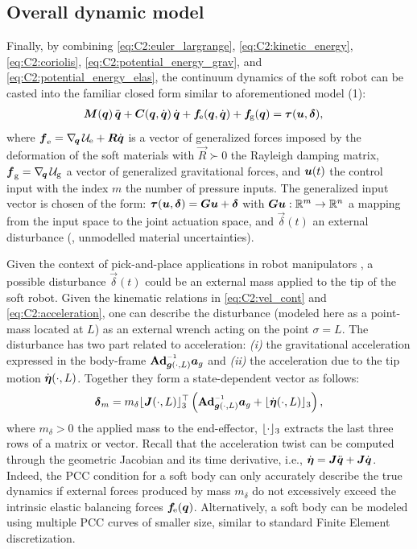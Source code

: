 \subsection{Overall dynamic model}
\noindent Finally, by combining \eqref{eq:C2:euler_largrange}, \eqref{eq:C2:kinetic_energy}, \eqref{eq:C2:coriolis}, \eqref{eq:C2:potential_energy_grav}, and \eqref{eq:C2:potential_energy_elas}, the continuum dynamics of the soft robot can be casted into the familiar closed form
\cite{DellaSantina2020,Boyer2021,Renda2018} similar to aforementioned model (1):
%
\begin{align}
\boldsymbol{M}({\boldsymbol{q}})\,{\ddot{\boldsymbol{q}}} + \boldsymbol{C}({\boldsymbol{q}},{\dot{\boldsymbol{q}}})\,{\dot{\boldsymbol{q}}} + {\boldsymbol{f}}\!_{\scriptstyle\textrm{e}}({\boldsymbol{q}},{\dot{\boldsymbol{q}}}) + {\boldsymbol{f}}\!_{\scriptstyle\textrm{g}}({\boldsymbol{q}}) & = \boldsymbol{\tau}({\boldsymbol{u}},\boldsymbol{\delta}),
\label{eq:C2:dynamic_model}
\end{align}
%
where ${\boldsymbol{f}}_{\scriptstyle\textrm{e}} = \nabla_{\!{\boldsymbol{q}}}\,\mathcal{U}_{\textrm{e}} + \boldsymbol{R}{\dot{\boldsymbol{q}}}$ is a vector of generalized forces imposed by the deformation of the soft materials with $\vec{R} \succ 0$ the Rayleigh damping matrix,
$\boldsymbol{f}_{\scriptstyle\textrm{g}} = \nabla_{\!{\boldsymbol{q}}}\, \mathcal{U}_{\scriptstyle\textrm{g}}$ a vector of generalized gravitational forces, and
${\boldsymbol{u}}(t)$ the control input with the index
$m$ the number of pressure inputs. The generalized input vector is chosen of the form:
$\boldsymbol{\tau}({\boldsymbol{u}},\boldsymbol{\delta}) = \boldsymbol{G}{\boldsymbol{u}} + \boldsymbol{\delta}$ with $\boldsymbol{G} {\boldsymbol{u}}: \mathbb{R}^m \to \mathbb{R}^n$ a mapping from the input space to the joint actuation space, and $\vec{\delta}(t)$ an external disturbance (\eg, unmodelled material uncertainties).
%
\begin{rmk}
Given the context of  pick-and-place applications in robot manipulators , a possible disturbance $\vec{\delta}(t)$ could be an external mass applied to the tip of the soft robot.  Given the kinematic relations in \eqref{eq:C2:vel_cont} and \eqref{eq:C2:acceleration}, one can describe the disturbance (modeled here as a point-mass located at $L$) as an external wrench acting on the point $\sigma = L$. The disturbance has two part related to acceleration: \textit{(i)} the gravitational acceleration expressed in the body-frame ${\normalfont \Ad}_{\gB(\cdot,L)}\inv \aB_g$ and \textit{(ii)} the acceleration due to the tip motion $\dot{{\boldsymbol{\eta}}}(\cdot,L)$. Together they form a state-dependent vector as follows: 
%
\begin{equation}
\vec{\delta}_m = m_\delta \floor{\JB(\cdot,L)}_3^\top\left({\normalfont \Ad}_{\gB(\cdot,L)}\inv \aB_g + \floor{\dot{\etaB}(\cdot,L)}_3 \right),
\label{eq:C2:delta_payload}
\end{equation}
%
where $m_\delta > 0$ the applied mass to the end-effector, $\lfloor\cdot\rfloor_3$ extracts the last three rows of a matrix or vector. Recall that the acceleration twist can be computed through the geometric Jacobian and its time derivative, i.e., $\dot{{\boldsymbol{\eta}}} = {\boldsymbol{J}}{\ddot{\boldsymbol{q}}} + {\boldsymbol{J}}{\dot{\boldsymbol{q}}}$. Indeed, the PCC condition for a soft body can only accurately describe the true dynamics if external forces produced by mass $m_\delta$ do not excessively exceed the intrinsic elastic balancing forces $\boldsymbol{f}\!_{\scriptstyle\textrm{e}}({\boldsymbol{q}})$. Alternatively, a soft body can be modeled using multiple PCC curves of smaller size, similar to standard Finite Element discretization.
\end{rmk}

